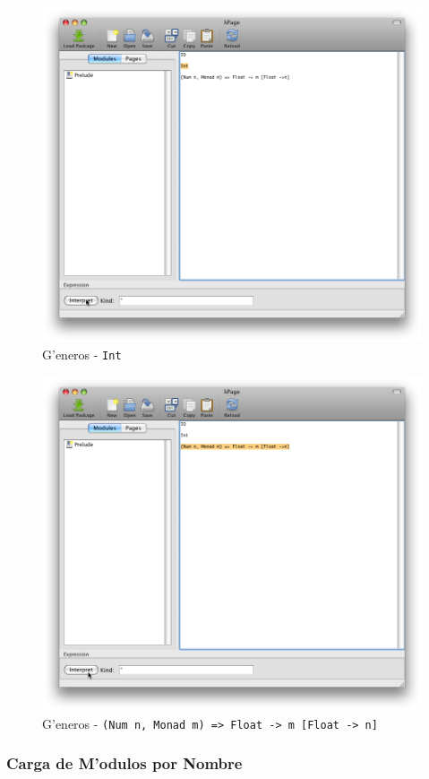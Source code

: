 \documentclass[a4paper]{article}
\begin{document}
\begin{figure}[hp]
	\begin{center}
        	\includegraphics[width=.75\textwidth]{pictures/kind02}
		\caption{G'eneros - \texttt{Int}}
		\label{etc5}
	\end{center}
\end{figure}
\begin{figure}[hp]
	\begin{center}
        	\includegraphics[width=.75\textwidth]{pictures/kind03}
		\caption{G'eneros - \texttt{(Num n, Monad m) =>\ Float ->\ m [Float ->\ n]}}
		\label{etc6}
	\end{center}
\end{figure}

\newpage
\subsubsection{Carga de M'odulos por Nombre}
\end{document}
